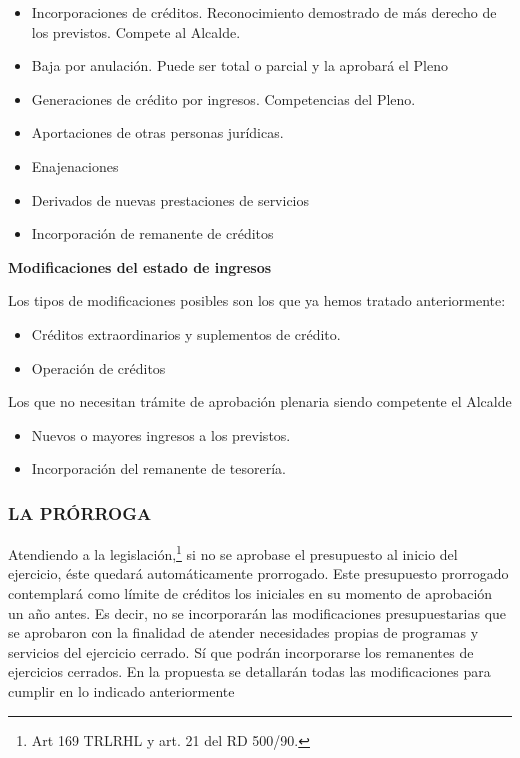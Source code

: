 \documentclass[
]{article}
\providecommand{\tightlist}{%
  \setlength{\itemsep}{0pt}\setlength{\parskip}{0pt}}
\begin{document}
\begin{itemize}
\tightlist
\item
  Incorporaciones de créditos. Reconocimiento demostrado de más derecho
  de los previstos. Compete al Alcalde.
\item
  Baja por anulación. Puede ser total o parcial y la aprobará el Pleno
\item
  Generaciones de crédito por ingresos. Competencias del Pleno.
\item
  Aportaciones de otras personas jurídicas.
\item
  Enajenaciones
\item
  Derivados de nuevas prestaciones de servicios
\item
  Incorporación de remanente de créditos
\end{itemize}

\textbf{Modificaciones del estado de ingresos}

Los tipos de modificaciones posibles son los que ya hemos tratado
anteriormente:

\begin{itemize}
\tightlist
\item
  Créditos extraordinarios y suplementos de crédito.
\item
  Operación de créditos
\end{itemize}

Los que no necesitan trámite de aprobación plenaria siendo competente el
Alcalde

\begin{itemize}
\tightlist
\item
  Nuevos o mayores ingresos a los previstos.
\item
  Incorporación del remanente de tesorería.
\end{itemize}

\hypertarget{la-pruxf3rroga}{%
\subsubsection{LA PRÓRROGA}\label{la-pruxf3rroga}}

Atendiendo a la legislación,\footnote{Art 169 TRLRHL y art. 21 del RD
  500/90.} si no se aprobase el presupuesto al inicio del ejercicio,
éste quedará automáticamente prorrogado. Este presupuesto prorrogado
contemplará como límite de créditos los iniciales en su momento de
aprobación un año antes. Es decir, no se incorporarán las modificaciones
presupuestarias que se aprobaron con la finalidad de atender necesidades
propias de programas y servicios del ejercicio cerrado. Sí que podrán
incorporarse los remanentes de ejercicios cerrados. En la propuesta se
detallarán todas las modificaciones para cumplir en lo indicado
anteriormente
\end{document}
